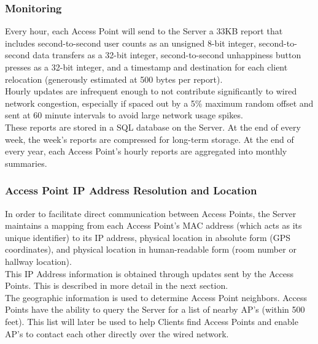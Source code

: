 \documentclass[11pt,twocolumn]{article}
\begin{document}
\subsubsection{Monitoring}
\indent Every hour, each Access Point will send to the Server a 33KB report that includes second-to-second user counts as an unsigned 8-bit integer, second-to-second data transfers as a 32-bit integer, second-to-second unhappiness button presses as a 32-bit integer, and a timestamp and destination for each client relocation (generously estimated at 500 bytes per report).\\
\indent Hourly updates are infrequent enough to not contribute significantly to wired network congestion, especially if spaced out by a 5\% maximum random offset and sent at 60 minute intervals to avoid large network usage spikes.\\
\indent These reports are stored in a SQL database on the Server. At the end of every week, the week’s reports are compressed for long-term storage. At the end of every year, each Access Point’s hourly reports are aggregated into monthly summaries.

\subsubsection{Access Point IP Address Resolution and Location}
\indent In order to facilitate direct communication between Access Points, the Server maintains a mapping from each Access Point’s MAC address (which acts as its unique identifier) to its IP address, physical location in absolute form (GPS coordinates), and physical location in human-readable form (room number or hallway location).\\
\indent This IP Address information is obtained through updates sent
by the Access Points. This is described in more detail in the next section.\\
\indent The geographic information is used to determine Access Point
neighbors. Access Points have the ability to query the Server for a 
list of nearby AP's (within 500 feet). This list will later be used to
help Clients find Access Points and enable AP's to contact each other directly over the wired network.\\
\end{document}
